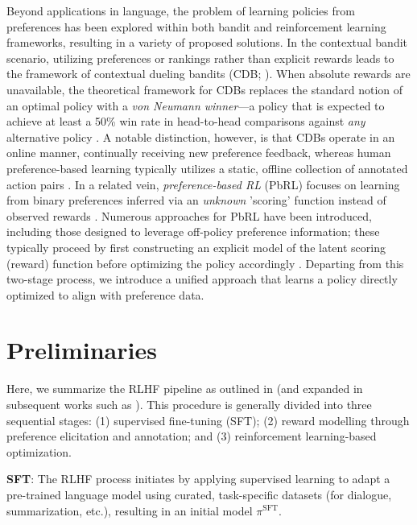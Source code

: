 Beyond applications in language, the problem of learning policies from preferences has been explored within both bandit and reinforcement learning frameworks, resulting in a variety of proposed solutions. In the contextual bandit scenario, utilizing preferences or rankings rather than explicit rewards leads to the framework of contextual dueling bandits (CDB; \cite{yue2012karmed,dudik2015contextual}). When absolute rewards are unavailable, the theoretical framework for CDBs replaces the standard notion of an optimal policy with a \textit{von Neumann winner}—a policy that is expected to achieve at least a 50\% win rate in head-to-head comparisons against \textit{any} alternative policy \citep{dudik2015contextual}. A notable distinction, however, is that CDBs operate in an online manner, continually receiving new preference feedback, whereas human preference-based learning typically utilizes a static, offline collection of annotated action pairs \citep{yan2022human}. In a related vein, \textit{preference-based RL} (PbRL) focuses on learning from binary preferences inferred via an \textit{unknown} 'scoring' function instead of observed rewards \citep{BusaFekete2014,ruiz2023dueling}. Numerous approaches for PbRL have been introduced, including those designed to leverage off-policy preference information; these typically proceed by first constructing an explicit model of the latent scoring (reward) function before optimizing the policy accordingly \citep{jain2013learning,BusaFekete2014,christiano2017deep,sadigh2017active,kupcsik2018learning}. Departing from this two-stage process, we introduce a unified approach that learns a policy directly optimized to align with preference data.

\section{Preliminaries}\label{section:prelims}

Here, we summarize the RLHF pipeline as outlined in \citeauthor{ziegler2020finetuning} (and expanded in subsequent works such as \citep{stiennon2022learning, bai2022training, ouyang2022training}). This procedure is generally divided into three sequential stages: (1) supervised fine-tuning (SFT); (2) reward modelling through preference elicitation and annotation; and (3) reinforcement learning-based optimization.

\textbf{SFT}: The RLHF process initiates by applying supervised learning to adapt a pre-trained language model using curated, task-specific datasets (for dialogue, summarization, etc.), resulting in an initial model $\pi^\text{SFT}$. 

